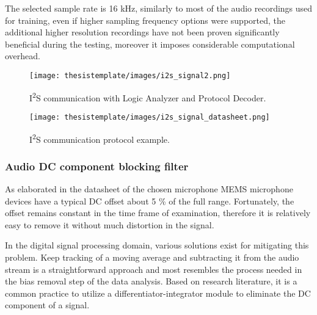 The selected sample rate is 16 kHz, similarly to most of the audio recordings used for training, even if higher sampling frequency options were supported, the additional higher resolution recordings have not been proven significantly beneficial during the testing, moreover it imposes considerable computational overhead.


\begin{figure}[h!]
  \begin{center}
    \texttt{[image: thesistemplate/images/i2s\_signal2.png]}
    \caption{I\textsuperscript{2}S communication with Logic Analyzer and Protocol Decoder.}
    \label{fig:i2s_comm_prot_meas}
  \end{center}
\end{figure}

\begin{figure}[h!]
  \begin{center}
    \texttt{[image: thesistemplate/images/i2s\_signal\_datasheet.png]}
    \caption{I\textsuperscript{2}S communication protocol example.}
    \label{fig:i2s_comm_prot}
  \end{center}
\end{figure}




\subsubsection{Audio DC component blocking filter}
\label{subsub:dc_blocking}

As elaborated in the datasheet of the chosen microphone MEMS microphone devices have a typical DC offset about 5 \% of the full range. Fortunately, the offset remains constant in the time frame of examination, therefore it is relatively easy to remove it without much distortion in the signal.

In the digital signal processing domain, various solutions exist for mitigating this problem. Keep tracking of a moving average and subtracting it from the audio stream is a straightforward approach and most resembles the process needed in the bias removal step of the data analysis. Based on research literature, it is a common practice to utilize a differentiator-integrator module to eliminate the DC component of a signal.

